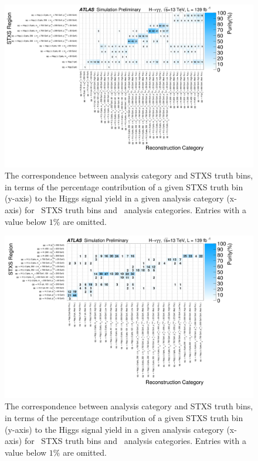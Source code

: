 \begin{landscape}
\begin{figure}[h]
\centering
\includegraphics[width=1.5\textwidth]{figures/couplings_chapter/purity_2D_subplots_5}
\caption{The correspondence between analysis category and STXS truth bins, in terms of the percentage contribution of a given STXS truth bin (y-axis) to the Higgs signal yield in a given analysis category (x-axis) for \qqtoHqq\ STXS truth bins and \ggtoH\ analysis categories. Entries with a value below $1\%$ are omitted.}
\label{fig:yields_5}
\end{figure}
\end{landscape}

\begin{figure}[h]
\centering
\includegraphics[width=1.09\textwidth]{figures/couplings_chapter/purity_2D_subplots_6}
\caption{The correspondence between analysis category and STXS truth bins, in terms of the percentage contribution of a given STXS truth bin (y-axis) to the Higgs signal yield in a given analysis category (x-axis) for \ggtoH\ STXS truth bins and \qqtoHqq\ analysis categories. Entries with a value below $1\%$ are omitted.}
\label{fig:yields_6}
\end{figure}

